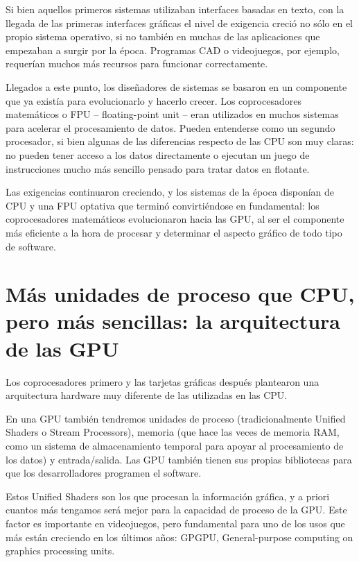 \documentclass[a4paper,openright,12pt, oneside]{book}
\begin{document}
Si bien aquellos primeros sistemas utilizaban interfaces basadas en texto, con la llegada de las primeras interfaces gr\'aficas el nivel de exigencia creci\'o no s\'olo en el propio sistema operativo, si no tambi\'en en muchas de las aplicaciones que empezaban a surgir por la \'epoca. Programas CAD o videojuegos, por ejemplo, requer\'ian muchos m\'as recursos para funcionar correctamente.

Llegados a este punto, los dise\~nadores de sistemas se basaron en un componente que ya exist\'ia para evolucionarlo y hacerlo crecer. Los coprocesadores matem\'aticos o FPU -- floating-point unit -- eran utilizados en muchos sistemas para acelerar el procesamiento de datos. Pueden entenderse como un segundo procesador, si bien algunas de las diferencias respecto de las CPU son muy claras: no pueden tener acceso a los datos directamente o ejecutan un juego de instrucciones mucho m\'as sencillo pensado para tratar datos en flotante.

Las exigencias continuaron creciendo, y los sistemas de la \'epoca dispon\'ian de CPU y una FPU optativa que termin\'o convirti\'endose en fundamental: los coprocesadores matem\'aticos evolucionaron hacia las GPU, al ser el componente m\'as eficiente a la hora de procesar y determinar el aspecto gr\'afico de todo tipo de software.

\section{M\'as unidades de proceso que CPU, pero m\'as sencillas: la arquitectura de las GPU}

Los coprocesadores primero y las tarjetas gr\'aficas despu\'es plantearon una arquitectura hardware muy diferente de las utilizadas en las CPU.

En una GPU tambi\'en tendremos unidades de proceso (tradicionalmente Unified Shaders o Stream Processors), memoria (que hace las veces de memoria RAM, como un sistema de almacenamiento temporal para apoyar al procesamiento de los datos) y entrada/salida. Las GPU tambi\'en tienen sus propias bibliotecas para que los desarrolladores programen el software.

Estos Unified Shaders son los que procesan la informaci\'on gr\'afica, y a priori cuantos m\'as tengamos ser\'a mejor para la capacidad de proceso de la GPU. Este factor es importante en videojuegos, pero fundamental para uno de los usos que m\'as est\'an creciendo en los \'ultimos a\~nos: GPGPU, General-purpose computing on graphics processing units.
\end{document}
